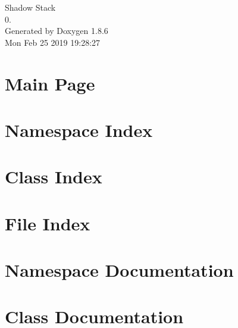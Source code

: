 \documentclass[twoside]{book}
\newcommand{\clearemptydoublepage}{%
  \newpage{\pagestyle{empty}\cleardoublepage}%
}
\begin{document}
\hypersetup{pageanchor=false}
\begin{titlepage}
\vspace*{7cm}
\begin{center}%
{\Large Shadow Stack \\[1ex]\large 0. }\\
\vspace*{1cm}
{\large Generated by Doxygen 1.8.6}\\
\vspace*{0.5cm}
{\small Mon Feb 25 2019 19:28:27}\\
\end{center}
\end{titlepage}
\clearemptydoublepage
\tableofcontents
\clearemptydoublepage
{}
\hypersetup{pageanchor=true}

\chapter{Main Page}
\label{index}\hypertarget{index}{}
\chapter{Namespace Index}

\chapter{Class Index}

\chapter{File Index}

\chapter{Namespace Documentation}



\chapter{Class Documentation}





















\end{document}
